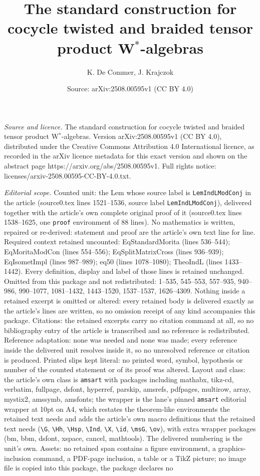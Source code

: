 \documentclass[10pt,a4paper]{amsart}
\title[The standard construction for cocycle twisted and braided te]{The standard construction for cocycle twisted and braided tensor product W$^*$-algebras}
\author{K. De Commer, J. Krajczok}
\date{Source: arXiv:2508.00595v1 (CC BY 4.0)}
\begin{document}
\maketitle

\noindent\emph{Source and licence.} The standard construction for cocycle twisted and braided tensor product W$^*$-algebras. Version arXiv:2508.00595v1 (CC BY 4.0), distributed under the Creative Commons Attribution 4.0 International licence, as recorded in the arXiv licence metadata for this exact version and shown on the abstract page https://arxiv.org/abs/2508.00595v1. Full rights notice: licenses/arxiv-2508.00595-CC-BY-4.0.txt.\par\smallskip

\noindent\textit{Editorial scope.} Counted unit: the Lem whose source label is \texttt{LemIndLModConj} in the article (source0.tex lines 1521--1536, source label \texttt{LemIndLModConj}), delivered together with the article's own complete original proof of it (source0.tex lines 1538--1625, one \texttt{proof} environment of 88 lines). No mathematics is written, repaired or re-derived: statement and proof are the article's own text line for line. Required context retained uncounted: EqStandardMorita (lines 536--544); EqMoritaModCon (lines 554--556); EqSplitMatrixCross (lines 936--939); EqIsometImpl (lines 987--989); eq50 (lines 1078--1080); TheoIndL (lines 1433--1442). Every definition, display and label of those lines is retained unchanged. Omitted from this package and not redistributed: 1--535, 545--553, 557--935, 940--986, 990--1077, 1081--1432, 1443--1520, 1537--1537, 1626--4309. Nothing inside a retained excerpt is omitted or altered: every retained body is delivered exactly as the article's lines are written, so no omission receipt of any kind accompanies this package. Citations: the retained excerpts carry no citation command at all, so no bibliography entry of the article is transcribed and no reference is redistributed. Reference adaptation: none was needed and none was made; every reference inside the delivered unit resolves inside it, so no unresolved reference or citation is produced. Printed slips kept literal: no printed word, symbol, hypothesis or number of the counted statement or of its proof was altered. Layout and class: the article's own class is \texttt{amsart} with packages including mathabx, tikz-cd, verbatim, fullpage, dsfont, hyperref, parskip, amsrefs, pdfpages, multirow, array, mystix2, amssymb, amsfonts; the wrapper is the lane's pinned \texttt{amsart} editorial wrapper at 10pt on A4, which restates the theorem-like environments the retained text needs and adds the article's own macro definitions that the retained text needs (\texttt{\textbackslash G}, \texttt{\textbackslash Hh}, \texttt{\textbackslash Hsp}, \texttt{\textbackslash Ind}, \texttt{\textbackslash X}, \texttt{\textbackslash id}, \texttt{\textbackslash msG}, \texttt{\textbackslash ov}), with extra wrapper packages (bm, bbm, dsfont, xspace, cancel, mathtools). The delivered numbering is the unit's own. Assets: no retained span contains a figure environment, a graphics-inclusion command, a PDF-page inclusion, a table or a TikZ picture; no image file is copied into this package, the package declares no 
\end{document}
